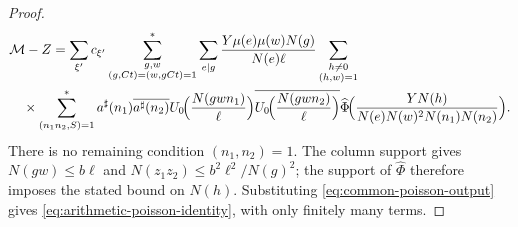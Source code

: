 \begin{proof}
\[
 \begin{aligned}
 &\mathcal M-Z=\sum_{\xi'}c_{\xi'}
 \sum_{\substack{g,w\\(g,Ct)=(w,gCt)=1}}^*
 \sum_{e\mid g}\frac{Y\mu(e)\mu(w)N(g)}{N(e)\ell}
 \sum_{\substack{h\ne0\\(h,w)=1}}\\
 &\quad\times\sum_{(n_1n_2,S)=1}^*a^\sharp(n_1)\overline{a^\sharp(n_2)}
 U_0\!\Bigl(\frac{N(gwn_1)}\ell\Bigr)
 \overline{U_0\!\Bigl(\frac{N(gwn_2)}\ell\Bigr)} \widehat\Phi\!\Bigl(
   \frac{YN(h)}{N(e)N(w)^2N(n_1)N(n_2)}\Bigr).
 \end{aligned}
\]
There is no remaining condition $(n_1,n_2)=1$. The column support gives
$N(gw)\le b\ell$ and $N(z_1z_2)\le b^2\ell^2/N(g)^2$;
the support of $\widehat\Phi$ therefore imposes the stated bound on
$N(h)$. Substituting \eqref{eq:common-poisson-output} gives
\eqref{eq:arithmetic-poisson-identity}, with only finitely many terms.
\end{proof}

